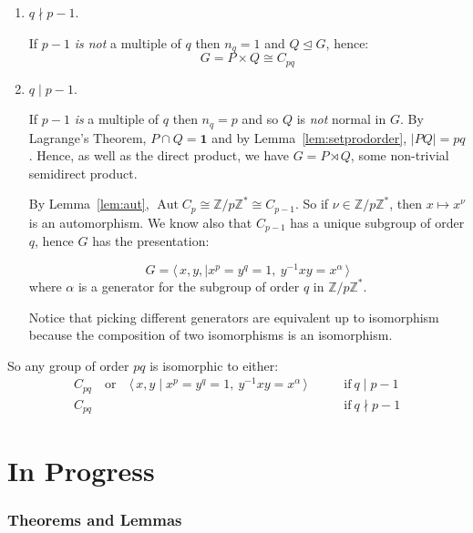 \documentclass[a4paper, oneside, 12pt, final]{article}
\theoremstyle{definition}
\DeclareMathOperator{\Aut}{Aut}
\newcommand{\Z}{\mathbb{Z}}
\newcommand{\Zn}[1]{\Z/#1\Z}
\begin{document}
\begin{enumerate}
    \item \(q \nmid p - 1\).

        If \(p-1\) \emph{is not} a multiple of \(q\) then \(n_q = 1\) and \(Q \unlhd G\), hence:
        \[G = P \times Q \cong C_{pq}\]

    \item \( q \mid p - 1\).

        If \(p-1\) \emph{is} a multiple of \(q\) then \(n_q = p\) and so \(Q\) is \emph{not} normal in \(G\).
        By Lagrange's Theorem, \(P \cap Q = \bm{1}\) and by Lemma~\ref{lem:setprodorder}, \(|PQ| = pq\).
        Hence, as well as the direct product, we have \(G = P \rtimes Q\), some non-trivial semidirect product.

        By Lemma~\ref{lem:aut}, \(\Aut{C_p} \cong \Zn{p}^* \cong C_{p-1}\).
        So if \(\nu \in \Zn{p}^*\), then \(x \mapsto x^\nu\) is an automorphism.
        We know also that \(C_{p-1}\) has a unique subgroup of order \(q\),
        hence \(G\) has the presentation:

        \[G = \langle \, x, y, \mid x^p = y^q = 1,\ y^{-1}xy = x^\alpha \, \rangle\]
        where \(\alpha\) is a generator for the subgroup of order \(q\) in
        \(\Zn{p}^*\).

        Notice that picking different generators are equivalent up to isomorphism because the composition of two
        isomorphisms is an isomorphism.
\end{enumerate}

So any group of order \(pq\) is isomorphic to either:
\begin{equation*}
\begin{aligned}
    C_{pq} \quad \text{or} \quad \langle \, x, y \mid x^p = y^q = 1,\ y^{-1}xy
    = x^\alpha \, \rangle \qquad &\text{if} \ q \mid p-1 \\
    C_{pq} \qquad &\text{if} \ q \nmid p-1
\end{aligned}
\end{equation*}



\part{In Progress}

\section{Theorems and Lemmas}
\end{document}
